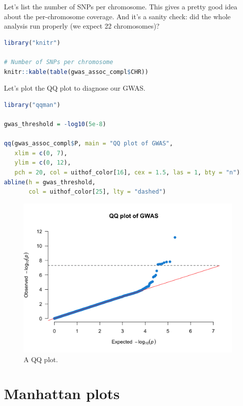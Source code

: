 \documentclass[
]{book}
\begin{document}
Let's list the number of SNPs per chromosome. This gives a pretty good idea about the per-chromosome coverage. And it's a sanity check: did the whole analysis run properly (we expect 22 chromosomes)?

\begin{lstlisting}[language=R]
library("knitr")

# Number of SNPs per chromosome
knitr::kable(table(gwas_assoc_compl$CHR))
\end{lstlisting}

Let's plot the QQ plot to diagnose our GWAS.

\begin{lstlisting}[language=R]
library("qqman")

gwas_threshold = -log10(5e-8)

qq(gwas_assoc_compl$P, main = "QQ plot of GWAS",
   xlim = c(0, 7),
   ylim = c(0, 12),
   pch = 20, col = uithof_color[16], cex = 1.5, las = 1, bty = "n")
abline(h = gwas_threshold,
       col = uithof_color[25], lty = "dashed")
\end{lstlisting}

\begin{figure}

{\centering \includegraphics[width=18.67in]{img/_gwas/show-qq} 

}

\caption{A QQ plot.}\label{fig:show-qq}
\end{figure}

\hypertarget{manhattan-plots}{%
\section{Manhattan plots}\label{manhattan-plots}}
\end{document}
